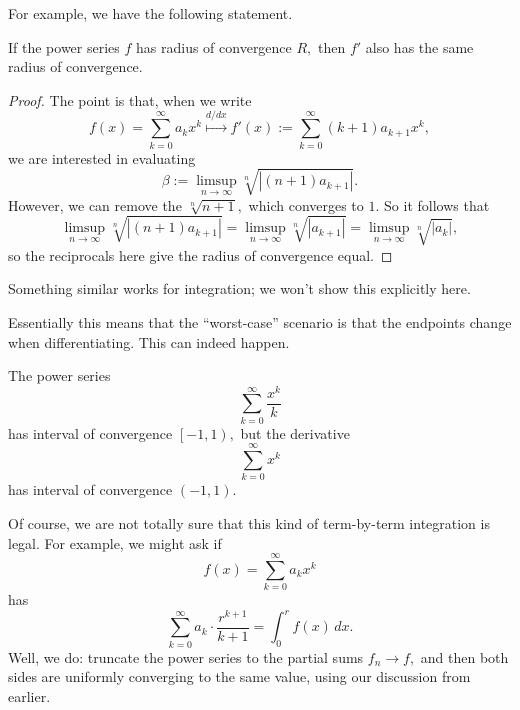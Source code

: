 For example, we have the following statement.
\begin{proposition}
	If the power series $f$ has radius of convergence $R,$ then $f'$ also has the same radius of convergence.
\end{proposition}
\begin{proof}
	The point is that, when we write
	\[f(x)=\sum_{k=0}^\infty a_kx^k\stackrel{d/dx}\longmapsto f'(x):=\sum_{k=0}^\infty(k+1)a_{k+1}x^k,\]
	we are interested in evaluating
	\[\beta:=\limsup_{n\to\infty}\sqrt[n]{|(n+1)a_{k+1}|}.\]
	However, we can remove the $\sqrt[n]{n+1},$ which converges to $1.$ So it follows that
	\[\limsup_{n\to\infty}\sqrt[n]{|(n+1)a_{k+1}|}=\limsup_{n\to\infty}\sqrt[n]{|a_{k+1}|}=\limsup_{n\to\infty}\sqrt[n]{|a_{k}|},\]
	so the reciprocals here give the radius of convergence equal.
\end{proof}
\begin{remark}
	Something similar works for integration; we won't show this explicitly here.
\end{remark}
Essentially this means that the ``worst-case'' scenario is that the endpoints change when differentiating. This can indeed happen.
\begin{example}
	The power series
	\[\sum_{k=0}^\infty\frac{x^k}k\]
	has interval of convergence $\left[-1,1\right),$ but the derivative
	\[\sum_{k=0}^\infty x^k\]
	has interval of convergence $(-1,1).$
\end{example}
Of course, we are not totally sure that this kind of term-by-term integration is legal. For example, we might ask if
\[f(x)=\sum_{k=0}^\infty a_kx^k\]
has
\[\sum_{k=0}^\infty a_k\cdot\frac{r^{k+1}}{k+1}=\int_0^rf(x)\,dx.\]
Well, we do: truncate the power series to the partial sums $f_n\to f,$ and then both sides are uniformly converging to the same value, using our discussion from earlier.

